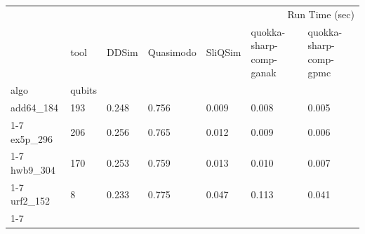 \begin{tabular}{lllllll}
\toprule
 &  & \multicolumn{5}{r}{Run Time (sec)} \\
 & tool & DDSim & Quasimodo & SliQSim & quokka-sharp-comp-ganak & quokka-sharp-comp-gpmc \\
algo & qubits &  &  &  &  &  \\
\midrule
add64_184 & 193 & 0.248 & 0.756 & 0.009 & 0.008 & 0.005 \\
\cline{1-7}
ex5p_296 & 206 & 0.256 & 0.765 & 0.012 & 0.009 & 0.006 \\
\cline{1-7}
hwb9_304 & 170 & 0.253 & 0.759 & 0.013 & 0.010 & 0.007 \\
\cline{1-7}
urf2_152 & 8 & 0.233 & 0.775 & 0.047 & 0.113 & 0.041 \\
\cline{1-7}
\bottomrule
\end{tabular}
